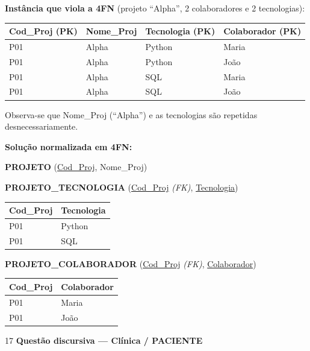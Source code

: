 \documentclass[12pt]{article}
\begin{document}
\begin{respdisc}
\textbf{Instância que viola a 4FN} (projeto ``Alpha'', 2 colaboradores e 2 tecnologias):

\medskip
\small
\begin{tabular}{|l|l|l|l|}
\hline
\textbf{Cod\_Proj (PK)} & \textbf{Nome\_Proj} & \textbf{Tecnologia (PK)} & \textbf{Colaborador (PK)} \\
\hline
P01 & Alpha & Python & Maria \\
P01 & Alpha & Python & João  \\
P01 & Alpha & SQL    & Maria \\
P01 & Alpha & SQL    & João  \\
\hline
\end{tabular}

\medskip
\normalsize
Observa-se que Nome\_Proj (``Alpha'') e as tecnologias são repetidas desnecessariamente.

\medskip
\textbf{Solução normalizada em 4FN:}

\medskip
\textbf{PROJETO} (\underline{Cod\_Proj}, Nome\_Proj)

\medskip
\textbf{PROJETO\_TECNOLOGIA} (\underline{Cod\_Proj} \textit{(FK)}, \underline{Tecnologia})

\small
\begin{tabular}{|l|l|}
\hline
Cod\_Proj & Tecnologia \\
\hline
P01 & Python \\
P01 & SQL    \\
\hline
\end{tabular}

\medskip
\normalsize
\textbf{PROJETO\_COLABORADOR} (\underline{Cod\_Proj} \textit{(FK)}, \underline{Colaborador})

\small
\begin{tabular}{|l|l|}
\hline
Cod\_Proj & Colaborador \\
\hline
P01 & Maria \\
P01 & João  \\
\hline
\end{tabular}
\end{respdisc}

\vspace{0.5cm}

\begin{gabbox}{17}
\textbf{Questão discursiva — Clínica / PACIENTE}
\end{gabbox}
\end{document}
